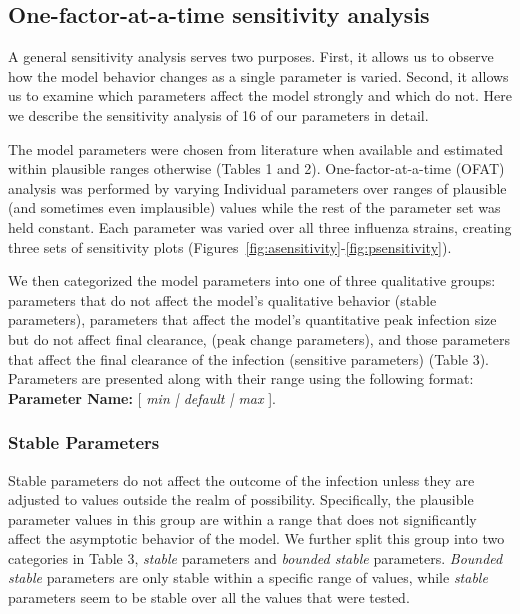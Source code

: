 \documentclass[preprint,10pt,authoryear]{article}
\begin{document}
\subsection{One-factor-at-a-time sensitivity analysis}

A general sensitivity analysis serves two purposes.  First, it allows us to observe how the model behavior changes as a single parameter is varied.  Second, it allows us to examine which parameters affect the model strongly and which do not.  Here we describe the sensitivity analysis of 16 of our parameters in detail.

The model parameters were chosen from literature when available and estimated within plausible ranges otherwise (Tables 1 and 2).  One-factor-at-a-time (OFAT) analysis was performed by varying Individual parameters over ranges of plausible (and sometimes even implausible) values while the rest of the parameter set was held constant.  Each parameter was varied over all three influenza strains, creating three sets of sensitivity plots (Figures~\ref{fig:asensitivity}-\ref{fig:psensitivity}).

We then categorized the model parameters into one of three qualitative groups: parameters that do not affect the model's qualitative behavior (stable parameters), parameters that affect the model's quantitative peak infection size but do not affect final clearance, (peak change parameters), and those parameters that affect the final clearance of the infection (sensitive parameters) (Table 3).  Parameters are presented along with their range using the following format:  \\

\textbf{Parameter Name:} [ \textit{min | default | max} ].


\subsubsection{Stable Parameters}

Stable parameters do not affect the outcome of the infection unless they are adjusted to values outside the realm of possibility.  Specifically, the plausible parameter values in this group are within a range that does not significantly affect the asymptotic behavior of the model.  We further split this group into two categories in Table 3, \textit{stable} parameters and \textit{bounded stable} parameters.  \textit{Bounded stable} parameters are only stable within a specific range of values, while \textit{stable} parameters seem to be stable over all the values that were tested.
\end{document}
